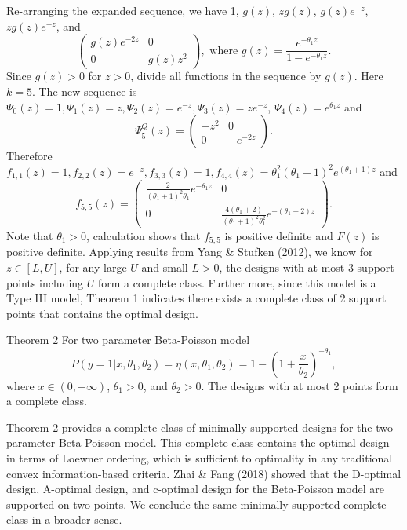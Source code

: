 \documentclass[12pt]{TD-CJS}
\begin{document}
Re-arranging the expanded sequence, we have 1, $g(z)$, $zg(z)$, $g(z)e^{-z}$, $zg(z)e^{-z}$, and \[\left( \begin{array}{cc}
 g(z)e^{-2z} & 0\\
0 &g(z)z^2 
\end{array} \right), \text{ where }g(z) = \frac{e^{-\theta_1z}}{1-e^{-\theta_1z}}. \] Since $g(z)>0$ for $z>0$, divide all functions in the sequence by $g(z)$. Here $k=5$. The new sequence is $\Psi_0(z) =1, \Psi_1(z) = z, \Psi_2(z) = e^{-z}, \Psi_3(z) =ze^{-z}$, $\Psi_4(z) =e^{\theta_1z}$ and  \[\Psi_5^Q(z)= \left( \begin{array}{cc}
-z^2& 0\\
0 &-e^{-2z}
\end{array} \right).\]  Therefore $f_{1,1}(z) = 1,f_{2,2}(z) = e^{-z},f_{3,3}(z) = 1,f_{4,4}(z) = \theta_1^2(\theta_1+1)^2e^{(\theta_1+1)z}$ and  \[f_{5,5}(z)= \left( \begin{array}{cc}
\frac{2}{(\theta_1+1)^2\theta_1}e^{-\theta_1z}& 0\\
0 & \frac{4(\theta_1+2)}{(\theta_1+1)^2\theta_1^2}e^{-(\theta_1+2)z}
\end{array} \right).\] Note that $\theta_1>0$, calculation shows that $f_{5,5}$ is positive definite and $F(z)$ is positive definite. Applying results from Yang \& Stufken (2012), we know for $z\in[L,U]$, for any large $U$ and small $L>0$, the designs with at most 3 support points including $U$ form a complete class. Further more, since this model is a Type III model, Theorem 1 indicates there exists a complete class of 2 support points that contains the optimal design. 



\begin{theorem}{Theorem 2}{}\label{beta}
For two parameter Beta-Poisson model \[
P(y=1|x,\theta_1,\theta_2) = \eta(x,\theta_1,\theta_2)= 1-(1+\frac{x}{\theta_2})^{-\theta_1},
\] where $x\in (0,+\infty)$, $\theta_1>0$, and $\theta_2>0$.  The designs with at most 2 points form a complete class.
\end{theorem}

Theorem 2 provides a complete class of minimally supported designs for the two-parameter Beta-Poisson model. This complete class contains the optimal design in terms of Loewner ordering, which is sufficient to optimality in any traditional convex information-based criteria. Zhai \& Fang (2018) showed that the D-optimal design, A-optimal design, and c-optimal design for the Beta-Poisson model are supported on two points. We conclude the same minimally supported complete class in a broader sense.
\end{document}
